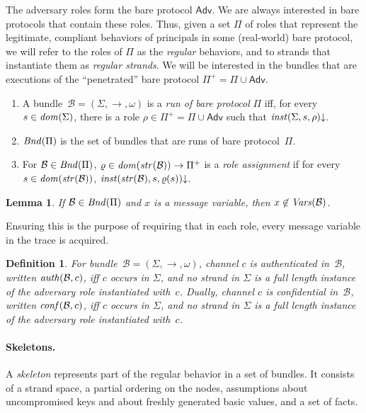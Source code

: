 \documentclass[12pt]{article}
\newcommand{\sdom}{\fn{dom}}
\newcommand{\vars}{\fn{Vars}}
\newcommand{\defd}{\mathord\downarrow}
\newcommand{\bun}{\ensuremath{\mathcal{B}}}
\newcommand{\atom}{basic value}
\newcommand{\ssp}{\Sigma}
\newcommand{\strands}{\sdom}
\newcommand{\str}{\fn{str}}
\newcommand{\run}{\fn{Bnd}}
\newcommand{\nonatomic}{{message}}
\newcounter{running}[section]
\newenvironment{renumerate}{\begin{enumerate}%
\setcounter{enumi}{\value{running}}}%
{\setcounter{running}{\value{enumi}}\end{enumerate}}
\newtheorem{definition}{Definition}
\newtheorem{lemma}{Lemma}
\newcommand{\Adv}{\ensuremath{\mathsf{Adv}}}
\begin{document}
The adversary roles form the bare protocol $\Adv$.  We are always
interested in bare protocols that contain these roles.  Thus, given a set
$\Pi$ of roles that represent the legitimate, compliant behaviors of
principals in some (real-world) bare protocol, we will refer to the roles
of $\Pi$ as the \emph{regular} behaviors, and to strands that
instantiate them as \emph{regular strands}.  We will be interested in
the bundles that are executions of the ``penetrated'' bare protocol
$\Pi^+=\Pi\cup\Adv$.
%
\begin{renumerate}
%
  \item A bundle~$\bun=(\ssp,\to,\omega)$ is a \emph{run of bare
    protocol} $\Pi$ iff, for every $s\in\strands(\ssp)$, there is a
    role $\rho\in\Pi^+=\Pi\cup\Adv$ such that
    $\fn{inst}(\ssp,s,\rho)\defd$.
%
  \item $\run(\Pi)$ is the set of bundles that are runs of bare
    protocol~$\Pi$.

  \item For $\bun\in\run(\Pi)$, $\varrho\in\sdom(\str(\bun))\to\Pi^+$ is a
    \emph{role assignment} if for every $s\in\sdom(\str(\bun))$,
    $\fn{inst}(\str(\bun),s,\varrho(s))\defd$.

\end{renumerate}
%
\begin{lemma}
  If $\bun\in\run(\Pi)$ and $x$ is a {\nonatomic} variable, then
  $x\not\in\vars(\bun)$.
\end{lemma}
%
Ensuring this is the purpose of requiring that in each role, every
{\nonatomic} variable in the trace is acquired.

\begin{definition}
  For bundle~$\bun=(\ssp,\to,\omega)$, channel $c$ is
  \emph{authenticated} in~{\bun}, written $\fn{auth}(\bun,c)$, iff $c$
  occurs in $\ssp$, and no strand in $\ssp$ is a full length instance
  of the  adversary role instantiated with~$c$.  Dually, channel $c$ is
  \emph{confidential} in~{\bun}, written $\fn{conf}(\bun,c)$, iff $c$
  occurs in $\ssp$, and no strand in $\ssp$ is a full length instance
  of the  adversary role instantiated with~$c$.
\end{definition}

\paragraph{Skeletons.}

A \emph{skeleton} represents part of the regular behavior in a set of
bundles.  It consists of a strand space, a partial ordering on the
nodes, assumptions about uncompromised keys and about freshly
generated {\atom}s, and a set of facts.
\end{document}

